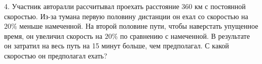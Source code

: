 4. Участник авторалли рассчитывал проехать расстояние 360 км с постоянной скоростью. Из-за тумана первую половину дистанции он ехал со скоростью на $20\%$ меньше намеченной. На второй половине пути, чтобы наверстать упущенное время, он увеличил скорость на $20\%$ по сравнению с намеченной. В результате он затратил на весь путь на 15 минут больше, чем предполагал. С какой скоростью он предполагал ехать?\\
